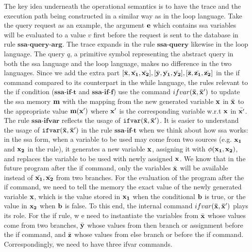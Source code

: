 \documentclass[a4paper,11pt]{article}
\begin{document}
%
%
{
The key idea underneath the operational semantics is to have the trace and the execution path being constructed in a similar way as in the loop language.
Take the query request as an example, the argument $\mathbf{{e}}$ which contains ssa variables will be evaluated to a value $v$ first before the request is sent to the database in rule $\textbf{ssa-query-arg}$. 
The trace expands in the rule $\textbf{ssa-query}$ likewise in the loop language. 
The query $q$, a primitive symbol representing the abstract query in both the ssa language and  the loop language, makes no difference in the two languages. 
Since we add the extra part $[\bar{\mathbf{{x}}}, \bar{\mathbf{{x_1}}}, \bar{\mathbf{{x_2}}}] ,[\bar{\mathbf{{y}}}, \bar{\mathbf{{y_1}}}, \bar{\mathbf{{y_2}}}] ,[\bar{\mathbf{{z}}},\bar{\mathbf{{z_1}}}, \bar{\mathbf{{z_2}}}]  $ in the if command compared to its counterpart in the while language, 
the rules relevant to the if condition ($\textbf{ssa-if-t}$ and $\textbf{ssa-if-f}$) use the command $ifvar(\mathbf{{\bar{x}, \bar{x}'}})$ to update the ssa memory $\mathbf{{m}}$ with the mapping from the new generated variable $\mathbf{{x}}$ in $\bar{\mathbf{{x}}}$ to the appropriate value $\mathbf{{m(x')}}$ where $\mathbf{{x'}}$ is the corresponding variable w.r.t $\mathbf{{x}}$ in $\bar{\mathbf{{x'}}}$.
%
The rule $\textbf{ssa-ifvar}$ reflects the usage of $\mathtt{ifvar}(\mathbf{{\bar{x}, \bar{x}'}})$.
%
It is easier to understand the usage of $\mathtt{ifvar}(\mathbf{{\bar{x}, \bar{x}'}})$ in the rule $\textbf{ssa-if-t}$ when we think about how ssa works: 
in the ssa form, when a variable to be used may come from two sources (e.g. $\mathbf{{x_1}}$ and $\mathbf{{x_2}}$ in the rule), it generates a new variable $\mathbf{{x}}$, assigning it with $\phi(\mathbf{{x_1}}, \mathbf{{x_2}})$,  and replaces the variable to be used with newly assigned $\mathbf{{x}}$. 
We know that in the future program after the if command, 
only the variables $\bar{\mathbf{{x}}}$ will be available instead of $\bar{\mathbf{{x_1}}}, \bar{\mathbf{{x_2}}}$ from two branches.
For the evaluation of the program after the if command, we need to tell the memory the exact value of the newly generated variable $\mathbf{{x}}$, which is the value stored in $\mathbf{{x_1}}$ when the conditional $\mathbf{{b}}$ is true, 
or the value in $\mathbf{{x_2}}$ when $\mathbf{{b}}$ is false. To this end, the internal command $ifvar(\mathbf{{\bar{x}, \bar{x}'}})$ plays its role. 
For the if rule, w
e need to instantiate the variables from $\bar{\mathbf{{x}}}$ whose values come from two branches, 
$\bar{\mathbf{{y}}}$ whose values from then branch or assignment before the if command, and $\bar{\mathbf{{z}}}$ whose values from else branch or before the if command. 
Correspondingly, we need to have three ifvar commands.   
}
\end{document}
